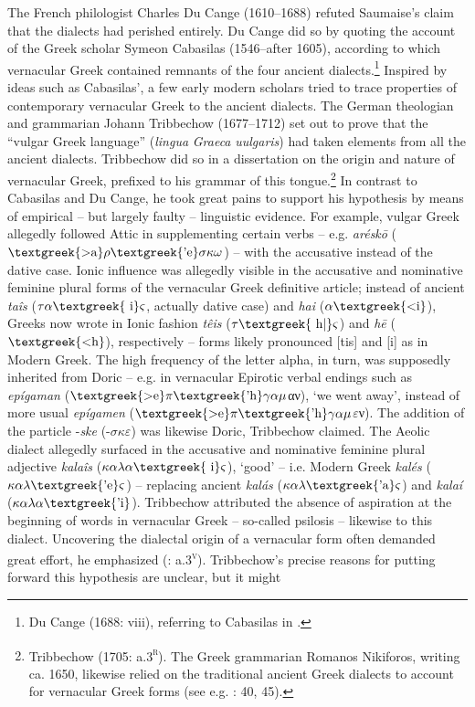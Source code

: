 The French philologist Charles Du Cange (1610–1688) refuted Saumaise’s claim that the dialects had perished entirely. Du Cange did so by quoting the account of the Greek scholar Symeon Cabasilas (1546–after 1605), according to which vernacular Greek contained remnants of the four ancient dialects.\footnote{Du Cange (1688: viii), referring to Cabasilas in \citet[462]{Crusius1584}.} Inspired by ideas such as Cabasilas’, a few early modern scholars tried to trace properties of contemporary vernacular Greek to the ancient dialects. The German theologian and grammarian Johann Tribbechow (1677–1712) set out to prove that the “vulgar Greek language” (\textit{lingua} \textit{Graeca} \textit{uulgaris}) had taken elements from all the ancient dialects. Tribbechow did so in a dissertation on the origin and nature of vernacular Greek, prefixed to his grammar of this tongue.\footnote{Tribbechow (1705: a.3\textsc{\textsuperscript{r}}). The Greek grammarian Romanos Nikiforos, writing ca. 1650, likewise relied on the traditional ancient Greek dialects to account for vernacular Greek forms (see e.g. \citealt{Nikiforos1908}: 40, 45).} In contrast to Cabasilas and Du Cange, he took great pains to support his hypothesis by means of empirical – but largely faulty – linguistic evidence. For example, vulgar Greek allegedly followed Attic in supplementing certain verbs – e.g. \textit{aréskō} ($\text{\textgreek{>a}}\rho \text{\textgreek{'e}}\sigma \kappa \omega $) – with the accusative instead of the dative case. Ionic influence was allegedly visible in the accusative and nominative feminine plural forms of the vernacular Greek definitive article; instead of ancient \textit{taîs} ($\tau \alpha \text{\textgreek{~i}}\varsigma $, actually dative case) and \textit{hai} ($\alpha \text{\textgreek{<i}}$), Greeks now wrote in Ionic fashion \textit{têis} ($\tau \text{\textgreek{~h|}}\varsigma $) and \textit{hē} ($\text{\textgreek{<h}}$), respectively – forms likely pronounced [tis] and [i] as in Modern Greek. The high frequency of the letter alpha, in turn, was supposedly inherited from Doric – e.g. in vernacular Epirotic verbal endings such as \textit{epígaman} ($\text{\textgreek{>e}}\pi \text{\textgreek{'h}}\gamma \alpha \mu $αν), ‘we went away’, instead of more usual \textit{epígamen} ($\text{\textgreek{>e}}\pi \text{\textgreek{'h}}\gamma \alpha \mu $$\varepsilon $ν). The addition of the particle -\textit{ske} (-$\sigma \kappa \varepsilon $) was likewise Doric, Tribbechow claimed. The Aeolic dialect allegedly surfaced in the accusative and nominative feminine plural adjective \textit{kalaîs} ($\kappa \alpha \lambda \alpha \text{\textgreek{~i}}\varsigma $), ‘good’ – i.e. Modern Greek \textit{kalés} ($\kappa \alpha \lambda \text{\textgreek{'e}}\varsigma $) – replacing ancient \textit{kalás} ($\kappa \alpha \lambda \text{\textgreek{'a}}\varsigma $) and \textit{kalaí} ($\kappa \alpha \lambda \alpha \text{\textgreek{'i}}$). Tribbechow attributed the absence of aspiration at the beginning of words in vernacular Greek – so-called psilosis – likewise to this dialect. Uncovering the dialectal origin of a vernacular form often demanded great effort, he emphasized (\citealt{Tribbechow1705}: a.3\textsc{\textsuperscript{v}}). Tribbechow’s precise reasons for putting forward this hypothesis are unclear, but it might 